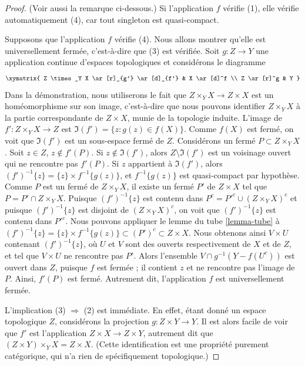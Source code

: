 \begin{proof}
(Voir aussi la remarque ci-dessous.)
Si l'application $f$ vérifie (1), elle vérifie automatiquement (4), car tout
singleton est quasi-compact.

\medskip\noindent
Supposons que l'application $f$ vérifie (4).
Nous allons montrer qu'elle est universellement fermée, c'est-à-dire que (3)
est vérifiée. Soit $g : Z \to Y$ une application continue d'espaces
topologiques et considérons le diagramme
$$
\xymatrix{
Z \times_Y X \ar[r]_{g'} \ar[d]_{f'} & X \ar[d]^f \\
Z \ar[r]^g & Y
}
$$
Dans la démonstration, nous utiliserons le fait que
$Z \times_Y X \to Z \times X$ est un homéomorphisme sur son image,
c'est-à-dire que nous pouvons identifier $Z \times_Y X$ à la partie
correspondante de $Z \times X$, munie de la topologie induite.
L'image de $f' : Z \times_Y X \to Z$ est
$\Im(f') = \{z : g(z) \in f(X)\}$.
Comme $f(X)$ est fermé, on voit que $\Im(f')$ est un sous-espace fermé de $Z$.
Considérons un fermé $P \subset Z \times_Y X$.
Soit $z \in Z$, $z \not \in f'(P)$.
Si $z \not \in \Im(f')$, alors $Z \setminus \Im(f')$ est un voisinage
ouvert qui ne rencontre pas $f'(P)$.
Si $z$ appartient à $\Im(f')$, alors
$(f')^{-1}\{z\} = \{z\} \times f^{-1}\{g(z)\}$, et
$f^{-1}\{g(z)\}$ est quasi-compact par hypothèse. Comme $P$ est un fermé de
$Z \times_Y X$, il existe un fermé $P'$ de $Z \times X$ tel que
$P = P' \cap Z \times_Y X$.
Puisque $(f')^{-1}\{z\}$ est contenu dans
$P^c = P'^c \cup (Z \times_Y X)^c$ et puisque $(f')^{-1}\{z\}$ est disjoint
de $(Z \times_Y X)^c$, on voit que $(f')^{-1}\{z\}$ est contenu dans $P'^c$.
Nous pouvons appliquer le lemme du tube \ref{lemma-tube} à
$(f')^{-1}\{z\} = \{z\} \times f^{-1}\{g(z)\}
\subset (P')^c \subset Z \times X$.
Nous obtenons ainsi $V \times U$ contenant $(f')^{-1}\{z\}$, où $U$ et $V$
sont des ouverts respectivement de $X$ et de $Z$, et tel que
$V \times U$ ne rencontre pas $P'$. Alors l'ensemble
$V \cap g^{-1}(Y-f(U^c))$ est ouvert dans $Z$, puisque $f$ est fermée ; il
contient $z$ et ne rencontre pas l'image de $P$. Ainsi, $f'(P)$ est fermé.
Autrement dit, l'application $f$ est universellement fermée.

\medskip\noindent
L'implication (3) $\Rightarrow$ (2) est immédiate.
En effet, étant donné un espace topologique $Z$, considérons la projection
$g : Z \times Y \to Y$. Il est alors facile de voir que $f'$ est
l'application $Z \times X \to Z \times Y$, autrement dit que
$(Z \times Y) \times_Y X = Z \times X$. (Cette identification est une
propriété purement catégorique, qui n'a rien de spécifiquement topologique.)


\end{proof}

